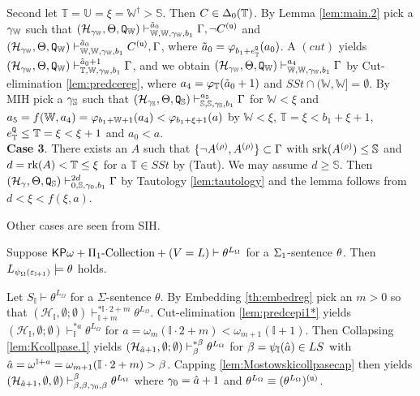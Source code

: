 \documentclass{article}
\newcommand{\mS}{\mathbb{S}}
\newcommand{\mI}{\mathbb{I}}
\newcommand{\mT}{\mathbb{T}}
\newcommand{\mU}{\mathbb{U}}
\newcommand{\mW}{\mathbb{W}}
\begin{document}
Second let $\mT=\mU=\xi=\mW^{\dagger}>\mS$. Then $C\in\Del_{0}(\mT)$.
By Lemma \ref{lem:main.2} pick a $\gam_{\mW}$ such that
$
(\mathcal{H}_{\gam_{\mW}},\Tht,{\tt Q}_{\mW})
\vdash^{\tilde{a}_{0}}_{\mW,\mW,\gam_{\mW},b_{1}}
\Gamma,\lnot C^{({\tt u})}
$
and
$
(\mathcal{H}_{\gam_{\mW}},\Tht,{\tt Q}_{\mW})
\vdash^{\tilde{a}_{0}}_{\mW,\mW,\gam_{\mW}, b_{1}}
C^{({\tt u})},\Gamma
$, where $\tilde{a}_{0}=\vphi_{b_{1}+e^{{\tt Q}}_{\mT}}(a_{0})$.
A $(cut)$ yields
$
(\mathcal{H}_{\gam_{\mW}},\Tht,{\tt Q}_{\mW})
\vdash^{\tilde{a}_{0}+1}_{\mT,\mW,\gam_{\mW},b_{1}}
\Gamma
$, and we obtain
$
(\mathcal{H}_{\gam_{\mW}},\Tht,{\tt Q}_{\mW})
\vdash^{a_{4}}_{\mW,\mW,\gam_{\mW},b_{1}}
\Gamma
$
by Cut-elimination \ref{lem:predcereg}, where
$a_{4}=\vphi_{\mT}(\tilde{a}_{0}+1)$ and $SSt\cap(\mW,\mW]=\emptyset$.
By MIH pick a $\gam_{\mS}$ such that
$
(\mathcal{H}_{\gam_{\mS}},\Tht,{\tt Q}_{\mS})
\vdash^{a_{5}}_{\mS,\mS,\gam_{\mS},b_{1}}
\Gamma
$
for $\mW<\xi$
and $a_{5}=f(\mW,a_{4})=\vphi_{b_{1}+\mW+1}(a_{4})<\vphi_{b_{1}+\xi+1}(a)$
by $\mW<\xi$, $\mT=\xi<b_{1}+\xi+1$, $e^{{\tt Q}}_{\mT}\leq\mT=\xi<\xi+1$ and $a_{0}<a$.
\\
\textbf{Case 3}. There exists an $A$ such that $\{\lnot A^{(\rho)},A^{(\rho)}\}\subset\Gamma$
with ${\rm srk}(A^{(\rho)})\leq\mS$
and $d=\rk(A)<\mT\leq\xi$ for a $\mT\in SSt$ by (Taut).
We may assume $d\geq\mS$.
Then
$(\calh_{\gam},\Tht,{\tt Q}_{\mS})\vdash^{2d}_{0,\mS,\gam_{0},b_{1}}\Gamma$ by Tautology \ref{lem:tautology} and the lemma follows from $d<\xi<f(\xi,a)$.



Other cases are seen from SIH.
\eprf

\begin{theorem}\label{thm:2}
Suppose ${\sf KP}\omega+\Pi_{1}\mbox{{\rm -Collection}}+(V=L)\vdash\theta^{L_{\Omega}}$
for a $\Sigma_{1}$-sentence $\theta$.
Then 
$L_{\psi_{\Ome}(\veps_{\mI+1})}\models\tht$ holds.
\end{theorem}
\bprf
Let 
$S_{\mI}\vdash\theta^{L_{\Omega}}$ for a $\Sigma$-sentence $\theta$.
By Embedding \ref{th:embedreg} pick an $m>0$ so that 
 $(\mathcal{H}_{\mI},\emptyset; \emptyset)
 \vdash_{\mI+m}^{* \mI\cdot 2+m}
\theta^{L_{\Omega}}$.
Cut-elimination \ref{lem:predcepi1*} yields 
$(\mathcal{H}_{\mI},\emptyset;\emptyset)
\vdash_{\mI}^{* a}\theta^{L_{\Omega}}$
for $a=\omega_{m}(\mI\cdot 2+m)<\omega_{m+1}(\mI+1)$.
Then Collapsing \ref{lem:Kcollpase.1} yields
$(\mathcal{H}_{\hat{a}+1},\emptyset;\emptyset)
\vdash_{\beta}^{* \beta}\theta^{L_{\Omega}}$
for $\bet=\psi_{\mI}(\hat{a})\in LS$ with 
$\hat{a}=\ome^{\mI+a}=\omega_{m+1}(\mI\cdot 2+m)>\bet$.
Capping \ref{lem:Mostowskicollpasecap} then yields
$(\mathcal{H}_{\hat{a}+1},\emptyset,\emptyset)
\vdash_{\beta,\beta,\gamma_{0},\beta}^{\beta}\theta^{L_{\Omega}}$
where $\gamma_{0}=\hat{a}+1$ and $\theta^{L_{\Omega}}\equiv(\theta^{L_{\Omega}})^{({\tt u})}$.
\end{document}
